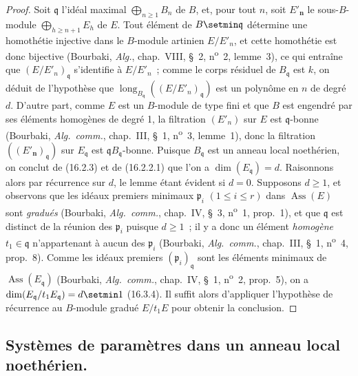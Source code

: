 \begin{proof}
Soit $\mathfrak{q}$ l'idéal maximal $\bigoplus_{n\geq1}B_n$ de $B$, et, pour
tout $n$, soit $E'_{\boldsymbol{n}}$ le sous-$B$-module $\bigoplus_{h\geq n+1}E_h$ de $E$.
Tout élément de $B\setmin\mathfrak{q}$ détermine une homothétie injective dans le
$B$-module artinien $E/E'_n$, et cette homothétie est donc bijective
(Bourbaki, \emph{Alg.}, chap.~VIII, \S~2, n\textsuperscript{o}~2, lemme~3), ce qui entraîne que
$(E/E'_n)_{\mathfrak{q}}$ s'identifie à $E/E'_n$~; comme le corps résiduel de
$B_{\mathfrak{q}}$ est $k$, on déduit de l'hypothèse que
$\operatorname{long}_{B_{\mathfrak{q}}}((E/E'_n)_{\mathfrak{q}})$ est un
polynôme en $n$ de degré $d$. D'autre part, comme $E$ est un $B$-module de
type fini et que $B$ est engendré par ses éléments homogènes de degré 1, la
filtration $(E'_n)$ sur $E$ est $\mathfrak{q}$-bonne (Bourbaki,
\emph{Alg.~comm.}, chap.~III, \S~1, n\textsuperscript{o}~3, lemme~1), donc la filtration
$((E'_{\boldsymbol{n}})_{\mathfrak{q}})$ sur $E_{\mathfrak{q}}$ est
$\mathfrak{q}B_{\mathfrak{q}}$-bonne. Puisque $B_{\mathfrak{q}}$ est un anneau
local noethérien, on conclut de (16.2.3) et de (16.2.2.1) que l'on a
$\dim(E_{\mathfrak{q}})=d$. Raisonnons alors par récurrence sur $d$, le lemme
étant évident si $d=0$. Supposons $d\geq1$, et observons que les idéaux premiers
minimaux $\mathfrak{p}_i$ $(1\leq i\leq r)$ dans
$\operatorname{Ass}(E)$ sont \emph{gradués} (Bourbaki, \emph{Alg.~comm.},
chap.~IV, \S~3, n\textsuperscript{o}~1, prop.~1), et que $\mathfrak{q}$ est distinct de la
réunion des $\mathfrak{p}_i$ puisque $d\geq1$~; il y a donc un élément
\emph{homogène} $t_1\in\mathfrak{q}$ n'appartenant à aucun des
$\mathfrak{p}_i$ (Bourbaki, \emph{Alg.~comm.}, chap.~III, \S~1, n\textsuperscript{o}~4,
prop.~8). Comme les idéaux premiers $(\mathfrak{p}_i)_{\mathfrak{q}}$ sont les
éléments minimaux de $\operatorname{Ass}(E_{\mathfrak{q}})$ (Bourbaki,
\emph{Alg.~comm.}, chap.~IV, \S~1, n\textsuperscript{o}~2, prop.~5), on a
$\dim(E_{\mathfrak{q}}/t_1E_{\mathfrak{q}})=d\setmin 1$ (16.3.4). Il suffit alors
d'appliquer l'hypothèse de récurrence au $B$-module gradué $E/t_1E$ pour
obtenir la conclusion.
\end{proof}

\subsection{Systèmes de paramètres dans un anneau local noethérien.}
\label{subsection:0.16.3-fr}


